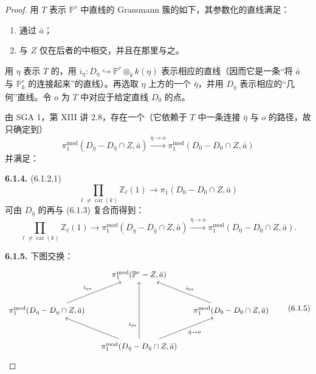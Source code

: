 \begin{proof}
用 $T$ 表示 $\mathbb P^r$ 中直线的 Grassmann 簇的如下，其参数化的直线满足：
\begin{enumerate}
\item[(i)] 通过 $\bar a$；
\item[(ii)] 与 $Z$ 仅在后者的中相交，并且在那里与之。
\end{enumerate}
用 $\eta$ 表示 $T$ 的，用 $i_\eta:D_\eta\hookrightarrow\mathbb P^r\otimes_k k(\eta)$ 表示相应的直线（因而它是一条“将 $\bar a$ 与 $\mathbb P_k^r$ 的连接起来”的直线）。再选取 $\eta$ 上方的一个 $\bar\eta$，并用 $D_{\bar\eta}$ 表示相应的“几何”直线。令 $o$ 为 $T$ 中对应于给定直线 $D_0$ 的点。

由 SGA 1，第 XIII 讲 2.8，存在一个（它依赖于 $T$ 中一条连接 $\bar\eta$ 与 $o$ 的路径，故只确定到）
\[
\pi_1^{\mathrm{mod}}(D_{\bar\eta}-D_{\bar\eta}\cap Z,\bar a)
\xrightarrow{\bar\eta\to o}
\pi_1^{\mathrm{mod}}(D_0-D_0\cap Z,\bar a)
\tag{6.1.3}
\]
并满足：

\textbf{6.1.4.}  (6.1.2.1)
\[
\prod_{\ell\neq\operatorname{car}(k)}\mathbb Z_\ell(1)
\longrightarrow\pi_1(D_0-D_0\cap Z,\bar a)
\]
可由 $D_{\bar\eta}$ 的再与 (6.1.3) 复合而得到：
\[
\prod_{\ell\neq\operatorname{car}(k)}\mathbb Z_\ell(1)
\longrightarrow\pi_1^{\mathrm{mod}}(D_{\bar\eta}-D_{\bar\eta}\cap Z,\bar a)
\xrightarrow{\bar\eta\to o}\pi_1^{\mathrm{mod}}(D_0-D_0\cap Z,\bar a).
\tag{6.1.4.1}
\]

\textbf{6.1.5.} 下图交换：
\[
\begin{tikzcd}[column sep=small,row sep=large]
&\pi_1^{\mathrm{mod}}(\mathbb P^r-Z,\bar a)&\\
\pi_1^{\mathrm{mod}}(D_\eta-D_\eta\cap Z,\bar a)
\arrow[ur,"i_{\eta*}"]&&
\pi_1^{\mathrm{mod}}(D_0-D_0\cap Z,\bar a)\arrow[ul,"i_{0*}"']\\
&\pi_1^{\mathrm{mod}}(D_{\bar\eta}-D_{\bar\eta}\cap Z,\bar a)
\arrow[ul]\arrow[uu,"i_{\bar\eta*}" near start]
\arrow[ur,"\bar\eta\to o"']&
\end{tikzcd}
\tag{6.1.5}
\]


\end{proof}
